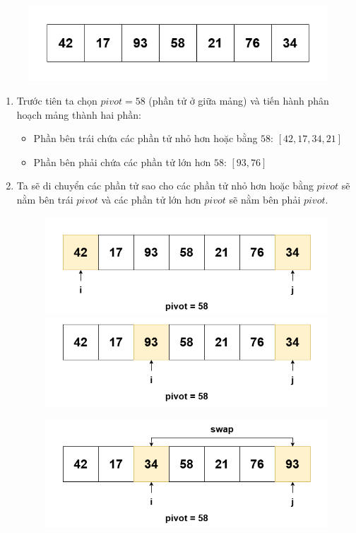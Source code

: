 \begin{figure}[H]
    \centering
    \includegraphics[width=0.75\linewidth]{img/quick_sort/1.png}
\end{figure}

\begin{enumerate}
    \item Trước tiên ta chọn $pivot = 58$ (phần tử ở giữa mảng) và tiến hành phân hoạch mảng thành hai phần:
    \begin{itemize}
        \item Phần bên trái chứa các phần tử nhỏ hơn hoặc bằng $58$: $[42, 17, 34, 21]$
        \item Phần bên phải chứa các phần tử lớn hơn $58$: $[93, 76]$
    \end{itemize}
    \item Ta sẽ di chuyển các phần tử sao cho các phần tử nhỏ hơn hoặc bằng $pivot$ sẽ nằm bên trái $pivot$ và các phần tử lớn hơn $pivot$ sẽ nằm bên phải $pivot$.
    
    \begin{figure}[H]
        \centering
        \includegraphics[width=0.75\linewidth]{img/quick_sort/2.png}
        
        \includegraphics[width=0.75\linewidth]{img/quick_sort/3.png}
        
    \end{figure}
    
    \begin{figure}[H]
        \centering
        \includegraphics[width=0.75\linewidth]{img/quick_sort/4.png}
    

\end{figure}
\end{enumerate}
